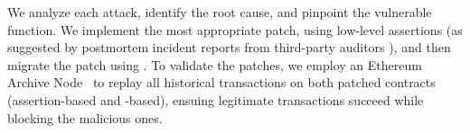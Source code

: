 We analyze each attack,
identify the root cause, and pinpoint the vulnerable function. 
We implement the most appropriate patch, 
using low-level assertions (as suggested by postmortem incident reports from third-party auditors 
\cite{consensys,trailofbits}), and then migrate the patch using \lang. 
To validate the patches, we employ an Ethereum Archive Node~\cite{reth} to replay all 
historical transactions on both
patched contracts (assertion-based and \lang-based), 
ensuing legitimate transactions succeed 
while blocking the malicious ones.

% 


